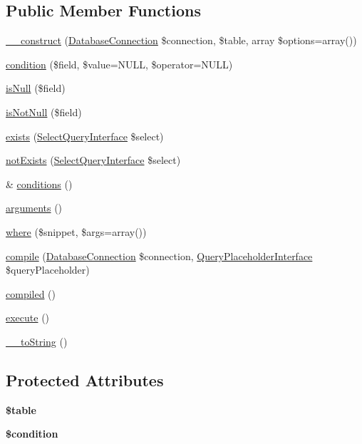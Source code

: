 \subsection*{Public Member Functions}
\begin{DoxyCompactItemize}
\item 
\hyperlink{classDeleteQuery_af2d5db5f72fff4100b0a1b175fd33e80}{\_\-\_\-construct} (\hyperlink{classDatabaseConnection}{DatabaseConnection} \$connection, \$table, array \$options=array())
\item 
\hyperlink{classDeleteQuery_ae88c47d15ce798fd7d62620361eb4277}{condition} (\$field, \$value=NULL, \$operator=NULL)
\item 
\hyperlink{classDeleteQuery_a2b252e7602b7b0e677ef79ae33af7dcd}{isNull} (\$field)
\item 
\hyperlink{classDeleteQuery_a673730f62b32a5111f4930d3a2e6cf89}{isNotNull} (\$field)
\item 
\hyperlink{classDeleteQuery_a22517a3fa29261685dd9f4a26b8cbb37}{exists} (\hyperlink{interfaceSelectQueryInterface}{SelectQueryInterface} \$select)
\item 
\hyperlink{classDeleteQuery_a026548cee31db2472b2b3b83c5c104c3}{notExists} (\hyperlink{interfaceSelectQueryInterface}{SelectQueryInterface} \$select)
\item 
\& \hyperlink{classDeleteQuery_a6c7bf743c3747bc37fad92940fc8e753}{conditions} ()
\item 
\hyperlink{classDeleteQuery_a16b4a6f2068378e594ed3d99e8e05a98}{arguments} ()
\item 
\hyperlink{classDeleteQuery_a1f4a560d33adeeab405fee5302a4a92e}{where} (\$snippet, \$args=array())
\item 
\hyperlink{classDeleteQuery_a62db6fe45f790c20479b6844ba58ac83}{compile} (\hyperlink{classDatabaseConnection}{DatabaseConnection} \$connection, \hyperlink{interfaceQueryPlaceholderInterface}{QueryPlaceholderInterface} \$queryPlaceholder)
\item 
\hyperlink{classDeleteQuery_a5f30ca2a90863366b492bc1a3b09ae24}{compiled} ()
\item 
\hyperlink{classDeleteQuery_a77b0690ed162255ae8a765fed7db0766}{execute} ()
\item 
\hyperlink{classDeleteQuery_a50b6319c4ee1f22b5a055d4ee2f910dc}{\_\-\_\-toString} ()
\end{DoxyCompactItemize}
\subsection*{Protected Attributes}
\begin{DoxyCompactItemize}
\item 
\hypertarget{classDeleteQuery_a1549ecc70533817e5a755a42753df208}{
{\bfseries \$table}}
\label{classDeleteQuery_a1549ecc70533817e5a755a42753df208}

\item 
\hypertarget{classDeleteQuery_a317f9600bf1e922aafb770cf6a6f7443}{
{\bfseries \$condition}}
\label{classDeleteQuery_a317f9600bf1e922aafb770cf6a6f7443}

\end{DoxyCompactItemize}


